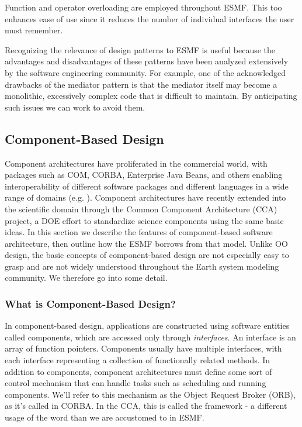 Function and operator overloading are employed throughout ESMF.  This too
enhances ease of use since it reduces the number of individual interfaces
the user must remember.  

Recognizing the relevance of design patterns to ESMF
is useful because the advantages and disadvantages of these patterns have
been analyzed extensively by the software engineering community.  For example,
one of the acknowledged drawbacks of the mediator pattern is that the mediator
itself may become a monolithic, excessively complex code that is difficult
to maintain.  By anticipating such issues we can work to avoid them.

\subsection{Component-Based Design}

Component architectures have proliferated in the commercial world, with
packages such as COM, CORBA, Enterprise Java Beans, and others enabling 
interoperability
of different software packages and different languages in a wide range
of domains (e.g. \cite{com, corba, javabeans}).  Component architectures have 
recently extended into the 
scientific domain through the Common Component Architecture (CCA) project, a 
DOE effort to standardize science components using the same basic ideas. \cite{cca}
In this section we describe the features of component-based software 
architecture, then outline how the ESMF borrows from that model.  Unlike
OO design, the basic concepts of component-based design are not especially
easy to grasp and are not widely understood throughout the Earth system 
modeling community.  We therefore go into some detail.

\subsubsection{What is Component-Based Design?}

In component-based design, applications are constructed using software entities 
called components, which are accessed only through {\it interfaces}.  
An interface is an array of function pointers.  Components usually have multiple 
interfaces, with each interface representing a collection of functionally 
related methods.  In addition to components, component 
architectures must define some sort of control mechanism that can handle tasks 
such as scheduling and running components.  We'll refer to
this mechanism as the Object Request Broker (ORB), as it's called in CORBA.  In the 
CCA, this is called the framework - a different usage
of the word than we are accustomed to in ESMF.

